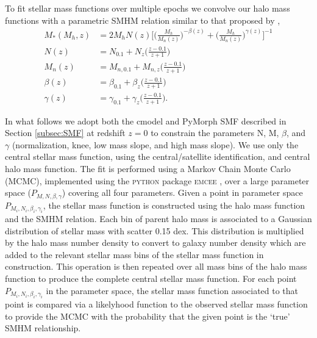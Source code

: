 To fit stellar mass functions over multiple epochs we convolve our halo mass functions with a parametric SMHM relation similar to that proposed by \cite{Moster2010},
\begin{equation}
\label{eqn:MosAbn}
\begin{split}
M_*(M_h, z) &= 2M_hN(z)\Big[ \Big( \frac{M_h}{M_{n}(z)}\Big) ^{- \beta(z)} + \Big( \frac{M_h}{M_{n}(z)}\Big)^{\gamma(z)} \Big ]^{-1}\\
N(z) &= N_{0.1} +N_z\Big(\frac{z-0.1}{z+1}\Big)\\
M_{n}(z) &= M_{n,0.1} +M_{n,z}\Big(\frac{z-0.1}{z+1}\Big)\\
\beta(z) &= \beta_{0.1} +\beta_z\Big(\frac{z-0.1}{z+1}\Big)\\
\gamma(z) &= \gamma_{0.1} +\gamma_z\Big(\frac{z-0.1}{z+1}\Big).
\end{split}
\end{equation}

In what follows we adopt both the cmodel and PyMorph SMF described in Section \ref{subsec:SMF} at redshift $z=0$ to constrain the parameters N, M, $\beta$, and $\gamma$ (normalization, knee, low mass slope, and high mass slope). We use only the central stellar mass function, using the \cite{Yang2012EvolutionHalos} central/satellite identification, and central halo mass function. The fit is performed using a Markov Chain Monte Carlo (MCMC), implemented using the \textsc{python} package \textsc{emcee} \citep{Foreman-Mackey2013Emcee:Hammer}, over a large parameter space ($P_{M, N, \beta, \gamma}$) covering all four parameters. Given a point in parameter space $P_{M_i, N_i, \beta_i, \gamma_i}$, the stellar mass function is constructed using the halo mass function and the SMHM relation. Each bin of parent halo mass is associated to a Gaussian distribution of stellar mass with scatter 0.15 dex. This distribution is multiplied by the halo mass number density to convert to galaxy number density which are added to the relevant stellar mass bins of the stellar mass function in construction. This operation is then repeated over all mass bins of the halo mass function to produce the complete central stellar mass function. For each point $P_{M_i, N_i, \beta_i, \gamma_i}$ in the parameter space, the stellar mass function associated to that point is compared via a likelyhood function to the observed stellar mass function to provide the MCMC with the probability that the given point is the `true' SMHM relationship. 

